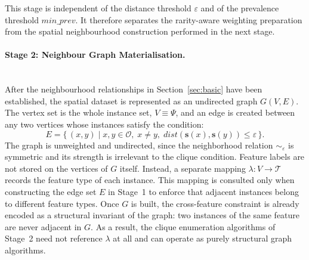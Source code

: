 \documentclass[12pt, letterpaper]{template}
\theoremstyle{definition}
\begin{document}
This stage is independent of the distance threshold $\varepsilon$ and of the prevalence
threshold $min\_prev$. It therefore separates the rarity-aware weighting preparation from the
spatial neighbourhood construction performed in the next stage.

\paragraph{Stage 2: Neighbour Graph Materialisation.}
\label{subsec:mcr_graph}
\leavevmode\\
After the neighbourhood relationships in Section~\ref{sec:basic} have been
established, the spatial dataset is represented as an undirected graph $G(V,E)$. The vertex
set is the whole instance set, $V \equiv \Psi$, and an edge is created between any two
vertices whose instances satisfy the condition:
\begin{equation}
E = \{\, (x,y) \mid x,y \in \mathcal{O},\; x \neq y,\; dist(\mathbf{s}(x), \mathbf{s}(y)) \le \varepsilon \,\}.
\end{equation}
The graph is unweighted and undirected, since the neighborhood relation
$\sim_{\varepsilon}$ is symmetric and its strength is irrelevant to the clique
condition. Feature labels are not stored on the vertices of $G$ itself.
Instead, a separate mapping $\lambda: V \rightarrow \mathcal{T}$ records the
feature type of each instance. This mapping is consulted only when
constructing the edge set $E$ in Stage~1 to enforce that adjacent
instances belong to different feature types. Once $G$ is built, the cross-feature constraint is already encoded as a structural
invariant of the graph: two instances of the same feature are never adjacent
in $G$. As a result, the clique enumeration algorithms of Stage~2 need not
reference $\lambda$ at all and can operate as purely structural graph
algorithms.
\end{document}
